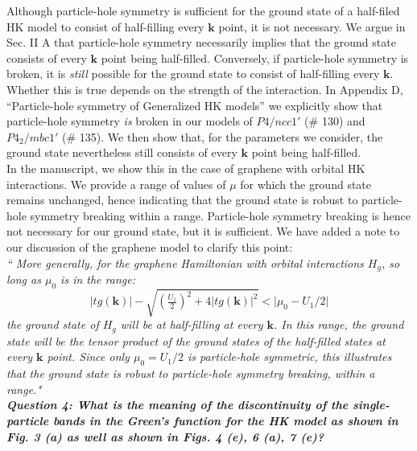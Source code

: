 \documentclass[aps,reprint,notitlepage,onecolumn,12pt]{revtex4-2}
\numberwithin{equation}{section}
\begin{document}
Although particle-hole symmetry is sufficient for the ground state of a half-filed HK model to consist of half-filling every $\mathbf{k}$ point, it is not necessary. 
We argue in Sec. II A that particle-hole symmetry necessarily implies that the ground state consists of every $\mathbf{k}$ point being half-filled. Conversely, if particle-hole symmetry is broken, it is \textit{still} possible for the ground state to consist of half-filling every $\mathbf{k}$. 
Whether this is true depends on the strength of the interaction. In Appendix D, ``Particle-hole symmetry of Generalized HK models'' we explicitly show that particle-hole symmetry \textit{is} broken in our models of $P4/ncc1'$ (\# 130) and $P4_2/mbc1'$ (\# 135). We then show that, for the parameters we consider, the ground state nevertheless still consists of every $\mathbf{k}$ point being half-filled. \\

\indent In the manuscript, we show this in the case of graphene with orbital HK interactions. 
We provide a range of values of $\mu$ for which the ground state remains unchanged, hence indicating that the ground state is robust to particle-hole symmetry breaking within a range. 
Particle-hole symmetry breaking is hence not necessary for our ground state, but it is sufficient. 
We have added a note to our discussion of the graphene model to clarify this point:\\
\textit{``
More generally, for the graphene Hamiltonian with orbital interactions $H_{g}$, so long as $\mu_0$ is in the range:
\begin{equation}
|tg(\mathbf{k})|-\sqrt{(\tfrac{U_1}{2})^2+4|tg(\mathbf{k})|^2}<\big|\mu_0-U_1/2\big|
\end{equation}
the ground state of $H_{g}$ will be at half-filling at every $\mathbf{k}$. 
In this range, the ground state will be the tensor product of the ground states of the half-filled states at every $\mathbf{k}$ point. Since only $\mu_0=U_1/2$ is particle-hole symmetric, this illustrates that the ground state is robust to particle-hole symmetry breaking, within a range."}\\



\textbf{\textit{Question 4: What is the meaning of the discontinuity of the single-particle bands in the Green’s function for the HK model as shown in Fig. 3 (a) as well as shown in Figs. 4 (e), 6 (a), 7 (e)?}}\\
\end{document}
